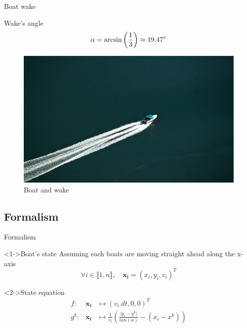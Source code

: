 \documentclass{beamer}
\begin{document}
            \begin{frame}{Boat wake}
                \centering
                \begin{minipage}{0.6\textwidth}
                    \begin{block}{Wake's angle}
                        \begin{equation}
                            \alpha = \arcsin\left(\frac{1}{3}\right) \approx 19.47 \degree
                        \end{equation}
                    \end{block}
                    \vspace{0.2cm}
                    \begin{figure}
                        \centering
                        \includegraphics[width=\textwidth,trim={0 0 17cm 14cm},clip]{imgs/motorboat}
                        \caption{Boat and wake}
                    \end{figure}
                \end{minipage}
            \end{frame}
        
        \subsection{Formalism}

            \begin{frame}{Formalism}
                \begin{block}<1->{Boat's state}
                    Assuming each boats are moving straight ahead along the x-axis
                    $$\forall i \in \llbracket 1, n\rrbracket, \quad \mathbf{x_i} = (x_i, y_i, v_i)^T$$ 
                \end{block}

                \begin{block}<2->{State equation}
                    \begin{eqnarray}
                        f:& \mathbf{x_i} &\mapsto (v_i.dt, 0, 0)^T \\
                        g^k:& \mathbf{x_i}  &\mapsto \frac{1}{v_i} \left(\frac{\lvert y_i - y^k \rvert}{tan(\alpha)} - (x_i - x^k)\right)
                    \end{eqnarray}
                \end{block}
            \end{frame}
\end{document}
